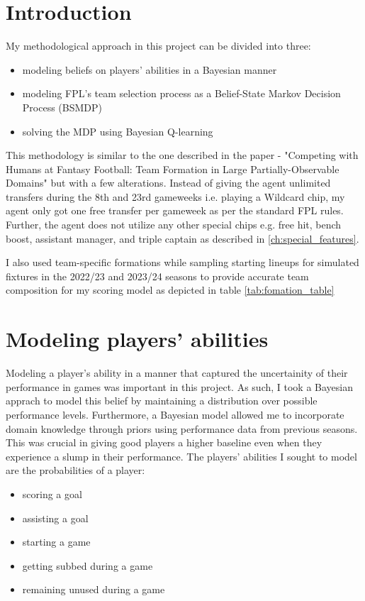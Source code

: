 \section{Introduction}
My methodological approach in this project can be divided into three: 
\begin{itemize}
    \item modeling beliefs on players' abilities in a Bayesian manner
    \item modeling FPL's team selection process as a Belief-State Markov Decision Process (BSMDP)
    \item solving the MDP using Bayesian Q-learning
\end{itemize}
This methodology is similar to the one described in the paper - "Competing with Humans at Fantasy Football: Team Formation in Large Partially-Observable Domains" \cite{matthews2012} but with a few alterations. Instead of giving the agent unlimited transfers during the 8th and 23rd gameweeks i.e. playing a Wildcard chip, my agent only got one free transfer per gameweek as per the standard FPL rules. Further, the agent does not utilize any other special chips e.g. free hit, bench boost, assistant manager, and triple captain as described in \ref{ch:special_features}.

I also used team-specific formations while sampling starting lineups for simulated fixtures in the 2022/23 and 2023/24 seasons to provide accurate team composition for my scoring model as depicted in table \ref{tab:fomation_table} 

\section{Modeling players' abilities}
Modeling a player's ability in a manner that captured the uncertainity of their performance in games was important in this project. As such, I took a Bayesian apprach to model this belief by maintaining a distribution over possible performance levels. Furthermore, a Bayesian model allowed me to incorporate domain knowledge through priors using performance data from previous seasons. This was crucial in giving good players a higher baseline even when they experience a slump in their performance. The players' abilities I sought to model are the probabilities of a player: 
\begin{itemize}
    \item scoring a goal
    \item assisting a goal
    \item starting a game
    \item getting subbed during a game
    \item remaining unused during a game
\end{itemize}

